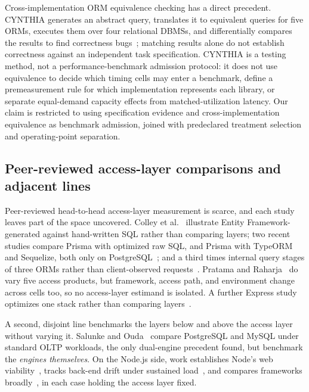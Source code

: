 Cross-implementation ORM equivalence checking has a direct precedent. CYNTHIA generates an abstract
query, translates it to equivalent queries for five ORMs, executes them over four relational DBMSs,
and differentially compares the results to find correctness bugs~\cite{sotiropoulos2021cynthia};
matching results alone do not establish correctness against an independent task specification.
CYNTHIA is a testing method, not a performance-benchmark admission protocol: it does not use
equivalence to decide which timing cells may enter a benchmark, define a premeasurement rule for
which implementation represents each library, or separate equal-demand capacity effects from
matched-utilization latency. Our claim is restricted to using specification evidence and
cross-implementation equivalence as benchmark admission, joined with predeclared treatment selection
and operating-point separation.

\subsection{Peer-reviewed access-layer comparisons and adjacent lines}
Peer-reviewed head-to-head access-layer measurement is scarce, and each study leaves part of the
space uncovered. Colley et al.~\cite{colley2018orm} illustrate Entity Framework-generated against
hand-written SQL rather than comparing layers; two recent studies compare Prisma with optimized raw
SQL, and Prisma with TypeORM and Sequelize, both only on
PostgreSQL~\cite{prisma_rawsql_2025,orm_compare_jcct_2025}; and a third times internal query stages
of three ORMs rather than client-observed requests~\cite{zhadko2025orm}. Pratama and
Raharja~\cite{pratama2023nodebench} do vary five access products, but framework, access path, and
environment change across cells too, so no access-layer estimand is isolated. A further Express
study optimizes one stack rather than comparing layers~\cite{imamsakti2025async}.

A second, disjoint line benchmarks the layers below and above the access layer without varying it.
Salunke and Ouda~\cite{salunke2024pgmysql} compare PostgreSQL and MySQL under standard OLTP
workloads, the only dual-engine precedent found, but benchmark the \emph{engines themselves}. On the
Node.js side, work establishes Node's web viability~\cite{chaniotis2015nodejs}, tracks back-end drift
under sustained load~\cite{kuffel2025nodejs}, and compares frameworks
broadly~\cite{carmo2024backend}, in each case holding the access layer fixed.


